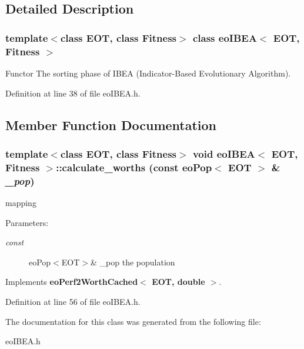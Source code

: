 \subsection{Detailed Description}
\subsubsection*{template$<$class EOT, class Fitness$>$ class eo\-IBEA$<$ EOT, Fitness $>$}

Functor The sorting phase of IBEA (Indicator-Based Evolutionary Algorithm). 



Definition at line 38 of file eo\-IBEA.h.

\subsection{Member Function Documentation}
\subsubsection{\setlength{\rightskip}{0pt plus 5cm}template$<$class EOT, class Fitness$>$ void {\bf eo\-IBEA}$<$ EOT, Fitness $>$::calculate\_\-worths (const {\bf eo\-Pop}$<$ EOT $>$ \& {\em \_\-pop})\hspace{0.3cm}{\tt  [inline, virtual]}}\label{classeoIBEA_e6b7c15e38822bef261c545b498eabef}


mapping 

\begin{Desc}
\item[Parameters:]
\begin{description}
\item[{\em const}]eo\-Pop$<$EOT$>$\& \_\-pop the population \end{description}
\end{Desc}


Implements {\bf eo\-Perf2Worth\-Cached$<$ EOT, double $>$}.

Definition at line 56 of file eo\-IBEA.h.

The documentation for this class was generated from the following file:\begin{CompactItemize}
\item 
eo\-IBEA.h\end{CompactItemize}

